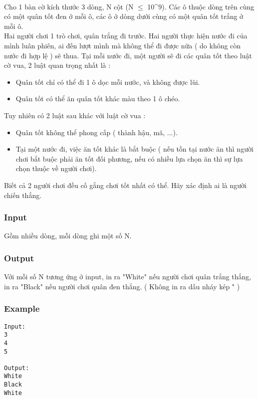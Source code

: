 

 

Cho 1 bàn cờ kích thước 3 dòng, N cột (N $\le$ 10^9). Các ô thuộc dòng trên cùng có một quân tốt đen ở mỗi ô, các ô ở dòng dưới cùng có một quân tốt trắng ở mỗi ô.
\\Hai người chơi 1 trò chơi, quân trắng đi trước. Hai người thực hiện nước đi của mình luân phiên, ai đến lượt mình mà không thể đi được nữa ( do không còn nước đi hợp lệ ) sẽ thua. Tại mỗi nước đi, một người sẽ đi các quân tốt theo luật cờ vua, 2 luật quan trọng nhất là :
\begin{itemize}
	\item Quân tốt chỉ có thể đi 1 ô dọc mỗi nước, và không được lùi.
	\item Quân tốt có thể ăn quân tốt khác màu theo 1 ô chéo.
\end{itemize}

Tuy nhiên có 2 luật sau khác với luật cờ vua :
\begin{itemize}
	\item Quân tốt không thể phong cấp ( thành hậu, mã, ...).
	\item Tại một nước đi, việc ăn tốt khác là bắt buộc ( nếu tồn tại nước ăn thì người chơi bắt buộc phải ăn tốt đối phương, nếu có nhiều lựa chọn ăn thì sự lựa chọn thuộc về người chơi).
\end{itemize}

Biết cả 2 người chơi đều cố gắng chơi tốt nhất có thể. Hãy xác định ai là người chiến thắng.

\subsubsection{Input}

Gồm nhiều dòng, mỗi dòng ghi một số N.

\subsubsection{Output}

Với mỗi số N tương ứng ở input, in ra "White" nếu người chơi quân trắng thắng, in ra "Black" nếu người chơi quân đen thắng. ( Không in ra dấu nháy kép " )

\subsubsection{Example}
\begin{verbatim}
Input:
3
4
5

Output:
White
Black
White
\end{verbatim}
